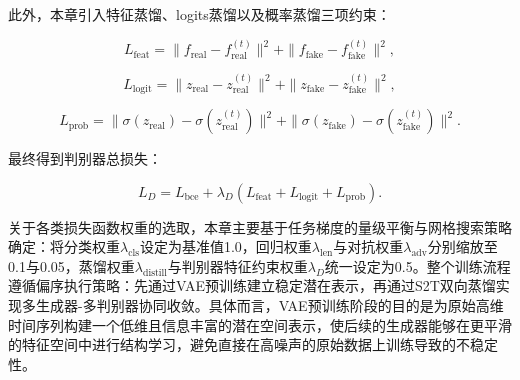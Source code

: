此外，本章引入特征蒸馏、logits蒸馏以及概率蒸馏三项约束：

\begin{equation}
L_{\text{feat}} =
\|f_{\text{real}} - f^{(t)}_{\text{real}}\|^2
+
\|f_{\text{fake}} - f^{(t)}_{\text{fake}}\|^2,
\end{equation}

\begin{equation}
L_{\text{logit}} =
\|z_{\text{real}} - z^{(t)}_{\text{real}}\|^2
+
\|z_{\text{fake}} - z^{(t)}_{\text{fake}}\|^2,
\end{equation}

\begin{equation}
L_{\text{prob}}
=
\|\sigma(z_{\text{real}}) - \sigma(z^{(t)}_{\text{real}})\|^2
+
\|\sigma(z_{\text{fake}}) - \sigma(z^{(t)}_{\text{fake}})\|^2.
\end{equation}

最终得到判别器总损失：

\begin{equation}
L_D
=
L_{\text{bce}}
+
\lambda_D\left(
L_{\text{feat}}
+
L_{\text{logit}}
+
L_{\text{prob}}
\right).
\end{equation}

关于各类损失函数权重的选取，本章主要基于任务梯度的量级平衡与网格搜索策略确定：将分类权重$\lambda_{\text{cls}}$设定为基准值1.0，回归权重$\lambda_{\text{len}}$与对抗权重$\lambda_{\text{adv}}$分别缩放至0.1与0.05，蒸馏权重$\lambda_{\text{distill}}$与判别器特征约束权重$\lambda_D$统一设定为0.5。整个训练流程遵循偏序执行策略：先通过VAE预训练建立稳定潜在表示，再通过S2T双向蒸馏实现多生成器-多判别器协同收敛。具体而言，VAE预训练阶段的目的是为原始高维时间序列构建一个低维且信息丰富的潜在空间表示，使后续的生成器能够在更平滑的特征空间中进行结构学习，避免直接在高噪声的原始数据上训练导致的不稳定性。

